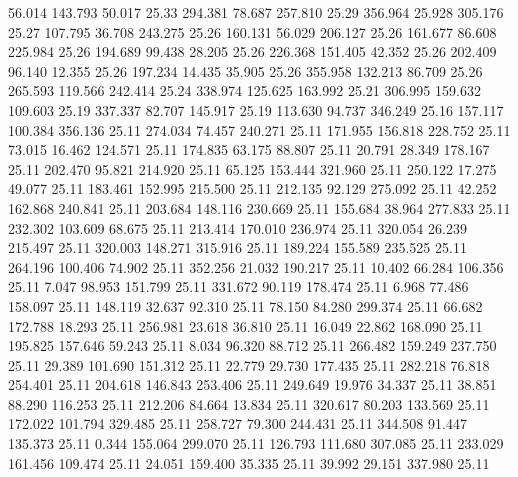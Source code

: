   56.014  143.793   50.017        25.33
 294.381   78.687  257.810        25.29
 356.964   25.928  305.176        25.27
 107.795   36.708  243.275        25.26
 160.131   56.029  206.127        25.26
 161.677   86.608  225.984        25.26
 194.689   99.438   28.205        25.26
 226.368  151.405   42.352        25.26
 202.409   96.140   12.355        25.26
 197.234   14.435   35.905        25.26
 355.958  132.213   86.709        25.26
 265.593  119.566  242.414        25.24
 338.974  125.625  163.992        25.21
 306.995  159.632  109.603        25.19
 337.337   82.707  145.917        25.19
 113.630   94.737  346.249        25.16
 157.117  100.384  356.136        25.11
 274.034   74.457  240.271        25.11
 171.955  156.818  228.752        25.11
  73.015   16.462  124.571        25.11
 174.835   63.175   88.807        25.11
  20.791   28.349  178.167        25.11
 202.470   95.821  214.920        25.11
  65.125  153.444  321.960        25.11
 250.122   17.275   49.077        25.11
 183.461  152.995  215.500        25.11
 212.135   92.129  275.092        25.11
  42.252  162.868  240.841        25.11
 203.684  148.116  230.669        25.11
 155.684   38.964  277.833        25.11
 232.302  103.609   68.675        25.11
 213.414  170.010  236.974        25.11
 320.054   26.239  215.497        25.11
 320.003  148.271  315.916        25.11
 189.224  155.589  235.525        25.11
 264.196  100.406   74.902        25.11
 352.256   21.032  190.217        25.11
  10.402   66.284  106.356        25.11
   7.047   98.953  151.799        25.11
 331.672   90.119  178.474        25.11
   6.968   77.486  158.097        25.11
 148.119   32.637   92.310        25.11
  78.150   84.280  299.374        25.11
  66.682  172.788   18.293        25.11
 256.981   23.618   36.810        25.11
  16.049   22.862  168.090        25.11
 195.825  157.646   59.243        25.11
   8.034   96.320   88.712        25.11
 266.482  159.249  237.750        25.11
  29.389  101.690  151.312        25.11
  22.779   29.730  177.435        25.11
 282.218   76.818  254.401        25.11
 204.618  146.843  253.406        25.11
 249.649   19.976   34.337        25.11
  38.851   88.290  116.253        25.11
 212.206   84.664   13.834        25.11
 320.617   80.203  133.569        25.11
 172.022  101.794  329.485        25.11
 258.727   79.300  244.431        25.11
 344.508   91.447  135.373        25.11
   0.344  155.064  299.070        25.11
 126.793  111.680  307.085        25.11
 233.029  161.456  109.474        25.11
  24.051  159.400   35.335        25.11
  39.992   29.151  337.980        25.11
